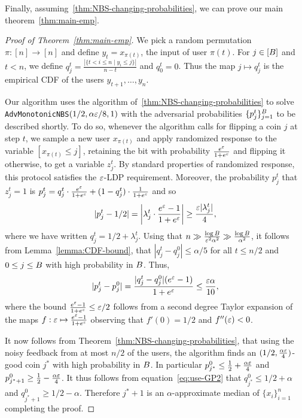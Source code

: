 Finally, assuming~\cref{thm:NBS-changing-probabilities}, we can prove our main theorem~\cref{thm:main-emp}.
\begin{proof}[Proof of Theorem~\ref{thm:main-emp}]
We pick a random permutation $\pi:[n]\to [n]$ and define $y_t=x_{\pi(t)}$, the input of user $\pi(t)$. For $j\in [B]$ and $t<n$, we define $q_j^t=\frac{|\{t< i\leq n\mid y_i\leq j\}|}{n-t}$ and $q_0^t=0$. Thus the map $j\mapsto q_j^t$ is the empirical CDF of the users $y_{t+1},\dots, y_n$. 

Our algorithm uses the algorithm of~\cref{thm:NBS-changing-probabilities} to solve \texttt{AdvMonotonicNBS}$(1/2,\alpha\varepsilon/8,1)$ with the adversarial probabilities $\{p_j^t\}_{j=1}^B$ to be described shortly. To do so, whenever the algorithm calls for flipping a coin $j$ at step $t$, we sample a new user $x_{\pi(t)}$ and apply randomized response to the variable $[x_{\pi(t)} \leq j]$, retaining the bit with probability $\frac{e^\varepsilon}{1+e^\varepsilon}$ and flipping it otherwise, to get a variable $z_j^t$. By standard properties of randomized response, this protocol satisfies the $\varepsilon$-LDP requirement. Moreover, the probability $p_j^t$ that $z_j^t=1$ is $p_j^t=q_j^t\cdot \frac{e^\varepsilon}{1+e^\varepsilon}+(1-q_j^t)\cdot \frac{1}{1+e^\varepsilon}$ and so
\begin{align}\label{eq:use-GP2}
|p_j^t-1/2|=\left|\lambda_j^t\cdot \frac{e^\varepsilon-1}{1+e^\varepsilon}\right|\geq \frac{\varepsilon|\lambda_j^t|}{4},
\end{align}
where we have written $q_j^t=1/2+\lambda_j^t$.
Using that $n\gg \frac{\log B}{\varepsilon^2\alpha^2}\gg \frac{\log B}{\alpha^2}$, it follows from Lemma~\ref{lemma:CDF-bound}, that $|q^{t}_j-q^{0}_j|\leq \alpha/5$ for all $t\leq n/2$ and $0\leq j\leq B$ with high probability in $B$. Thus,
\[
|p_j^t-p_j^0|=\frac{|q_j^t-q_j^0|(e^\varepsilon-1)}{1+e^\varepsilon}\leq \frac{\varepsilon\alpha}{10},
\]
where the bound $\frac{e^\varepsilon-1}{1+e^\varepsilon}\leq \varepsilon/2$ follows from a second degree Taylor expansion of the maps $f:\varepsilon\mapsto \frac{e^\varepsilon-1}{1+e^\varepsilon}$ observing that $f'(0)=1/2$ and $f''(\varepsilon)<0$.

It now follows from Theorem~\ref{thm:NBS-changing-probabilities}, that using the noisy feedback from at most $n/2$ of the users, the algorithm finds an $(1/2, \frac{\alpha\varepsilon}{4})$-good coin $j^*$ with high probability in $B$. In particular  $p_{j^*}^0\leq \frac{1}{2}+\frac{\alpha\varepsilon}{4}$ and $p_{j^*+1}^0\geq \frac{1}{2}-\frac{\alpha\varepsilon}{4}$. It thus follows from equation~\eqref{eq:use-GP2} that $q_{j^*}^0\leq 1/2+\alpha$ and $q_{j^*+1}^0\geq 1/2-\alpha$. Therefore $j^*+1$ is an $\alpha$-approximate median of $\{x_i\}_{i=1}^n$ completing the proof.
\end{proof}